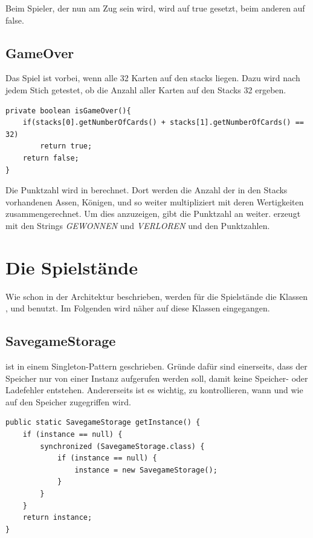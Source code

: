 Beim Spieler, der nun am Zug sein wird, wird  auf true
gesetzt, beim anderen auf false.

\subsection{GameOver}

Das Spiel ist vorbei, wenn alle 32 Karten auf den stacks liegen. Dazu wird nach
jedem Stich getestet, ob die Anzahl aller Karten auf den Stacks 32 ergeben.

\begin{lstlisting}[caption={isGameOver() Methode},captionpos=b]
private boolean isGameOver(){
    if(stacks[0].getNumberOfCards() + stacks[1].getNumberOfCards() == 32)
        return true;
    return false;
}
\end{lstlisting}

Die Punktzahl wird in  berechnet. Dort werden die Anzahl
der in den Stacks vorhandenen Assen, Königen, und so weiter multipliziert mit
deren Wertigkeiten zusammengerechnet. Um dies anzuzeigen, gibt 
die Punktzahl an  weiter.  erzeugt
 mit den Strings \emph{GEWONNEN} und \emph{VERLOREN} und den
Punktzahlen.

\section{Die Spielstände}
\sectionauthor{\leonard}

Wie schon in der Architektur beschrieben, werden für die Spielstände die Klassen
,  und  benutzt. Im
Folgenden wird näher auf diese Klassen eingegangen.

\subsection{SavegameStorage}

ist in einem Singleton-Pattern geschrieben. Gründe dafür sind einerseits, dass
der Speicher nur von einer Instanz aufgerufen werden soll, damit keine Speicher-
oder Ladefehler entstehen. Andererseits ist es wichtig, zu kontrollieren, wann
und wie auf den Speicher zugegriffen wird.

\begin{lstlisting}[caption={SavegameStorage Singleton},captionpos=b]
public static SavegameStorage getInstance() {
	if (instance == null) {
		synchronized (SavegameStorage.class) {
			if (instance == null) {
				instance = new SavegameStorage();
			}
		}
	}
	return instance;
}
\end{lstlisting}

